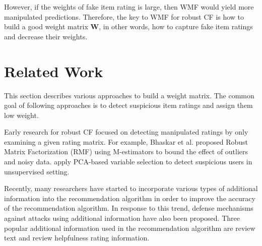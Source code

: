 \documentclass[master,english,final]{kaist-ucs}
\begin{document}
However, if the weights of fake item rating is large, then WMF would yield more manipulated predictions.
Therefore, the key to WMF for robust CF is how to build a good weight matrix $\bm{W}$, in other words, how to capture fake item ratings and decrease their weights.



\chapter{Related Work}
This section describes various approaches to build a weight matrix.
The common goal of following approaches is to detect suspicious item ratings and assign them low weight.


Early research for robust CF focused on detecting manipulated ratings by only examining a given rating matrix.
For example, Bhaskar et al. \cite{RMF} proposed Robust Matrix Factorization (RMF) using M-estimators to bound the effect of outliers and noisy data.
\cite{LiesAndPropaganda,UnsupervisedShilling,AttackResistant} apply PCA-based variable selection to detect suspicious users in unsupervised setting.

Recently, many researchers have started to incorporate various types of additional information into the recommendation algorithm in order to improve the accuracy of the recommendation algorithm.
In response to this trend, defense mechanisms against attacks using additional information have also been proposed.
Three popular additional information used in the recommendation algorithm are review text and review helpfulness rating information.
\end{document}
